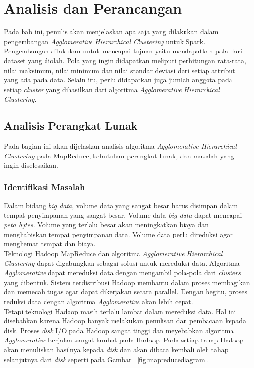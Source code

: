 \chapter{Analisis dan Perancangan}
\label{chap:Analisis dan Perancangan}

Pada bab ini, penulis akan menjelaskan apa saja yang dilakukan dalam pengembangan \textit{Agglomerative Hierarchical Clustering} untuk Spark. Pengembangan dilakukan untuk mencapai tujuan yaitu mendapatkan pola dari dataset yang diolah. Pola yang ingin didapatkan meliputi perhitungan rata-rata, nilai maksimum, nilai minimum dan nilai standar deviasi dari setiap attribut yang ada pada data. Selain itu, perlu didapatkan juga jumlah anggota pada setiap \textit{cluster} yang dihasilkan dari algoritma \textit{Agglomerative Hierarchical Clustering}.


\section{Analisis Perangkat Lunak}

Pada bagian ini akan dijelaskan analisis algoritma \textit{Agglomerative Hierarchical Clustering} pada MapReduce, kebutuhan perangkat lunak, dan masalah yang ingin diselesaikan. 

\subsection{Identifikasi Masalah}

Dalam bidang \textit{big data}, volume data yang sangat besar harus disimpan dalam tempat penyimpanan yang sangat besar. Volume data \textit{big data} dapat mencapai \textit{peta bytes}. Volume yang terlalu besar akan meningkatkan biaya dan menghabiskan tempat penyimpanan data. Volume data perlu direduksi agar menghemat tempat dan biaya.\\ 

Teknologi Hadoop MapReduce dan algoritma \textit{Agglomerative Hierarchical Clustering} dapat digabungkan sebagai solusi untuk mereduksi data. Algoritma \textit{Agglomerative} dapat mereduksi data dengan mengambil pola-pola dari \textit{clusters} yang dibentuk. Sistem terdistribusi Hadoop membantu dalam proses membagikan dan memecah tugas agar dapat dikerjakan secara parallel.  Dengan begitu, proses reduksi data dengan algoritma \textit{Agglomerative} akan lebih cepat. \\

Tetapi teknologi Hadoop masih terlalu lambat dalam mereduksi data. Hal ini disebabkan karena Hadoop banyak melakukan penulisan dan pembacaan kepada disk. Proses \textit{disk} I/O pada Hadoop sangat tinggi dan meyebabkan algoritma \textit{Agglomerative} berjalan sangat lambat pada Hadoop. Pada setiap tahap Hadoop akan menuliskan hasilnya kepada \textit{disk} dan akan dibaca kembali oleh tahap selanjutnya dari \textit{disk} seperti pada Gambar  ~\ref{fig:mapreducediagram}.\\

